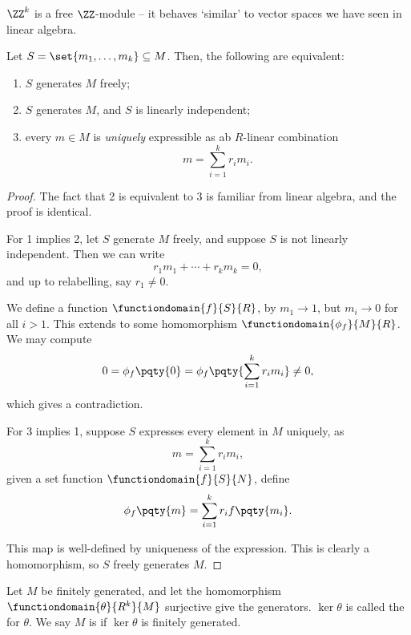 \begin{remark}
    \(\ZZ^k\) is a free \(\ZZ\)-module -- it behaves `similar' to vector spaces we have seen in linear algebra.
\end{remark}

\begin{proposition}
    \label{prop:basis-linear-independence-unique-combination}%
    Let \(S = \set{m_1, \ldots, m_k} \subseteq M\). Then, the following are equivalent:
    \begin{enumerate}
        \item \(S\) generates \(M\) freely;
        \item \(S\) generates \(M\), and \(S\) is linearly independent;
        \item every \(m \in M\) is \emph{uniquely} expressible as ab \(R\)-linear combination
        \[
            m = \sum_{i = 1}^{k} r_i m_i.
        \]
    \end{enumerate}
\end{proposition}

\begin{proof}
    The fact that 2 is equivalent to 3 is familiar from linear algebra, and the proof is identical.

    For 1 implies 2, let \(S\) generate \(M\) freely, and suppose \(S\) is not linearly independent. Then we can write
    \[
        r_1 m_1 + \cdots + r_k m_k = 0,
    \]
    and up to relabelling, say \(r_1 \neq 0\).

    We define a function \(\functiondomain{f}{S}{R}\), by \(m_1 \to 1\), but \(m_i \to 0\) for all \(i > 1\). This extends to some homomorphism \(\functiondomain{\phi_f}{M}{R}\). We may compute
    \[
        0 = \phi_f\pqty{0} = \phi_f \pqty{\sum_{i = 1}^{k} r_i m_i} \neq 0,
    \]
    which gives a contradiction.

    For 3 implies 1, suppose \(S\) expresses every element in \(M\) uniquely, as
    \[
        m = \sum_{i = 1}^{k} r_i m_i,
    \]
    given a set function \(\functiondomain{f}{S}{N}\), define
    \[
        \phi_f\pqty{m} = \sum_{i = 1}^{k} r_i f\pqty{m_i}.
    \]

    This map is well-defined by uniqueness of the expression. This is clearly a homomorphism, so \(S\) freely generates \(M\).
\end{proof}

\begin{definition}
    \label{def:module-of-relations-finitely-presented}%
    Let \(M\) be finitely generated, and let the homomorphism \(\functiondomain{\theta}{R^k}{M}\) surjective give the generators. \(\ker \theta\) is called the  for \(\theta\). We say \(M\) is  if \(\ker \theta\) is finitely generated.
\end{definition}

